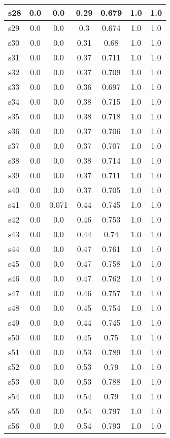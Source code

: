 \documentclass{article}
\begin{document}
\begin{tabular}{|l|c|c|c|c|c|c|}
\hline
s28 &0.0 & 0.0 & 0.29 & 0.679 & 1.0 & 1.0\\
\hline
s29 &0.0 & 0.0 & 0.3 & 0.674 & 1.0 & 1.0\\
\hline
s30 &0.0 & 0.0 & 0.31 & 0.68 & 1.0 & 1.0\\
\hline
s31 &0.0 & 0.0 & 0.37 & 0.711 & 1.0 & 1.0\\
\hline
s32 &0.0 & 0.0 & 0.37 & 0.709 & 1.0 & 1.0\\
\hline
s33 &0.0 & 0.0 & 0.36 & 0.697 & 1.0 & 1.0\\
\hline
s34 &0.0 & 0.0 & 0.38 & 0.715 & 1.0 & 1.0\\
\hline
s35 &0.0 & 0.0 & 0.38 & 0.718 & 1.0 & 1.0\\
\hline
s36 &0.0 & 0.0 & 0.37 & 0.706 & 1.0 & 1.0\\
\hline
s37 &0.0 & 0.0 & 0.37 & 0.707 & 1.0 & 1.0\\
\hline
s38 &0.0 & 0.0 & 0.38 & 0.714 & 1.0 & 1.0\\
\hline
s39 &0.0 & 0.0 & 0.37 & 0.711 & 1.0 & 1.0\\
\hline
s40 &0.0 & 0.0 & 0.37 & 0.705 & 1.0 & 1.0\\
\hline
s41 &0.0 & 0.071 & 0.44 & 0.745 & 1.0 & 1.0\\
\hline
s42 &0.0 & 0.0 & 0.46 & 0.753 & 1.0 & 1.0\\
\hline
s43 &0.0 & 0.0 & 0.44 & 0.74 & 1.0 & 1.0\\
\hline
s44 &0.0 & 0.0 & 0.47 & 0.761 & 1.0 & 1.0\\
\hline
s45 &0.0 & 0.0 & 0.47 & 0.758 & 1.0 & 1.0\\
\hline
s46 &0.0 & 0.0 & 0.47 & 0.762 & 1.0 & 1.0\\
\hline
s47 &0.0 & 0.0 & 0.46 & 0.757 & 1.0 & 1.0\\
\hline
s48 &0.0 & 0.0 & 0.45 & 0.754 & 1.0 & 1.0\\
\hline
s49 &0.0 & 0.0 & 0.44 & 0.745 & 1.0 & 1.0\\
\hline
s50 &0.0 & 0.0 & 0.45 & 0.75 & 1.0 & 1.0\\
\hline
s51 &0.0 & 0.0 & 0.53 & 0.789 & 1.0 & 1.0\\
\hline
s52 &0.0 & 0.0 & 0.53 & 0.79 & 1.0 & 1.0\\
\hline
s53 &0.0 & 0.0 & 0.53 & 0.788 & 1.0 & 1.0\\
\hline
s54 &0.0 & 0.0 & 0.54 & 0.79 & 1.0 & 1.0\\
\hline
s55 &0.0 & 0.0 & 0.54 & 0.797 & 1.0 & 1.0\\
\hline
s56 &0.0 & 0.0 & 0.54 & 0.793 & 1.0 & 1.0\\

\end{tabular}
\end{document}
